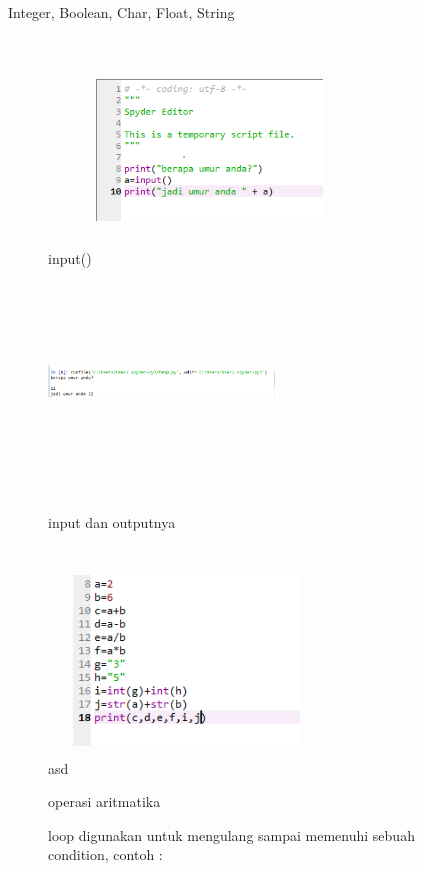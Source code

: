 \begin{enumerate}
\item Integer, Boolean, Char, Float, String
\begin{figure}
\item input()
\centering
\includegraphics[width=6cm,height=6cm]{figures/c1.png}
\includegraphics[width=6cm,height=6cm]{figures/c2.png}
\caption {input dan outputnya}
\end{figure}
\begin{figure}
\item asd
\centering
\includegraphics[width=6cm,height=6cm]{figures/c3.png}
\caption{operasi aritmatika}
\end{figure}
\begin{figure}
\item loop digunakan untuk mengulang sampai memenuhi sebuah condition, contoh :

\end{figure}
\end{enumerate}
